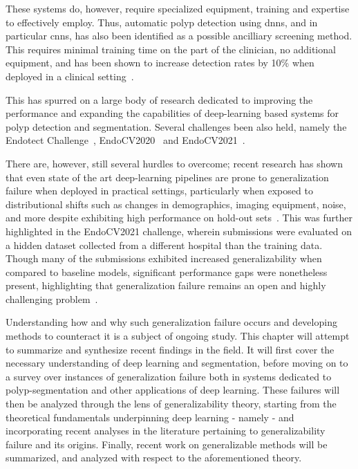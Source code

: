 These systems do, however, require specialized equipment, training and expertise to effectively employ. Thus, automatic polyp detection using \glspl{dnn}, and in particular \glspl{cnn}, has also been identified as a possible ancilliary screening method. This requires minimal training time on the part of the clinician, no additional equipment, and has been shown to increase detection rates by 10\% when deployed in a clinical setting~\cite{polyp-success-story}. 

This has spurred on a large body of research dedicated to improving the performance and expanding the capabilities of deep-learning based systems for polyp detection and segmentation. Several challenges been also held, namely the Endotect Challenge~\cite{endotect}, EndoCV2020~\cite{endocv2020} and EndoCV2021~\cite{endocv2021}.

There are, however, still several hurdles to overcome; recent research has shown that even state of the art deep-learning pipelines are prone to generalization failure when deployed in practical settings, particularly when exposed to distributional shifts such as changes in demographics, imaging equipment, noise, and more despite exhibiting high performance on hold-out sets~\cite{retinopathy, damour2020underspecification, pneumonia, shortcut_learning}. This was further highlighted in the EndoCV2021 challenge, wherein submissions were evaluated on a hidden dataset collected from a different hospital than the training data. Though many of the submissions exhibited increased generalizability when compared to baseline models, significant performance gaps were nonetheless present, highlighting that generalization failure remains an open and highly challenging problem~\cite{endocv2021}. 

Understanding how and why such generalization failure occurs and developing methods to counteract it is a subject of ongoing study. This chapter will attempt to summarize and synthesize recent findings in the field. It will first cover the necessary understanding of deep learning and segmentation, before moving on to a survey over instances of generalization failure both in systems dedicated to polyp-segmentation and other applications of deep learning. These failures will then be analyzed through the lens of generalizability theory, starting from the theoretical fundamentals underpinning deep learning - namely  - and incorporating recent analyses in the literature pertaining to generalizability failure and its origins. Finally, recent work on generalizable methods will be summarized, and analyzed with respect to the aforementioned theory. 
	
